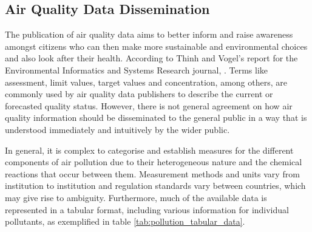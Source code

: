 \subsection{Air Quality Data Dissemination}
The publication of air quality data aims to better inform and raise awareness amongst citizens who can then make more sustainable and environmental choices and also look after their health. According to Thinh and Vogel’s report for the Environmental Informatics and Systems Research journal,  \cite{Thinh2007}. Terms like assessment, limit values, target values and concentration, among others, are commonly used by air quality data publishers to describe the current or forecasted quality status. However, there is not general agreement on how air quality information should be disseminated to the general public in a way that is understood immediately and intuitively by the wider public. 

In general, it is complex to categorise and establish measures for the different components of air pollution due to their heterogeneous nature and the chemical reactions that occur between them. Measurement methods and units vary from institution to institution and regulation standards vary between countries, which may give rise to ambiguity. Furthermore, much of the available data is represented in a tabular format, including various information for individual pollutants, as exemplified in table \ref{tab:pollution_tabular_data}. 

